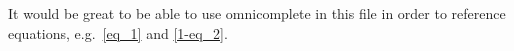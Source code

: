 \documentclass{article}
\begin{document}
It would be great to be able to use omnicomplete in this file in order to
reference equations, e.g.~\ref{eq_1} and \ref{1-eq_2}.
\end{document}
